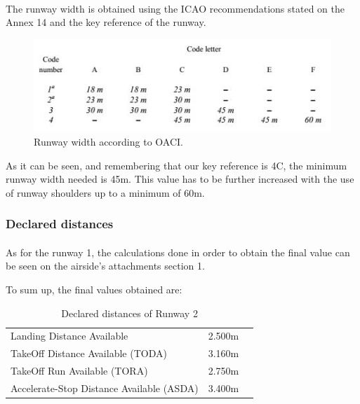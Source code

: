 		\paragraph{}The runway width is obtained using the ICAO recommendations stated on the Annex 14 and the key reference of the runway. 
	
		\begin{figure}[H]
			\centering
			\includegraphics[clip, trim=0cm 0cm 0cm 0cm, width=1\textwidth]{./images/Annex14/RunwayWidth}
			\caption{Runway width according to OACI.} %
			\label{} %
		\end{figure}
	
		As it can be seen, and remembering that our key reference is 4C, the minimum runway width needed is 45m. This value has to be further increased with the use of runway shoulders up to a minimum of 60m. 
	
		\subsubsection{Declared distances}
		\paragraph{} As for the runway 1, the calculations done in order to obtain the final value can be seen on the airside’s attachments section 1. 
	
	To sum up, the final values obtained are:
	
	\begin{table}[htb]
		\centering
		\begin{tabular}{ll p{5cm}}
			\midrule[2pt]
			Landing Distance Available & 2.500m\\
			TakeOff Distance Available (TODA) & 3.160m\\
			TakeOff Run Available (TORA)& 2.750m\\
			Accelerate-Stop Distance Available (ASDA)& 3.400m\\
			\bottomrule[2pt]
		\end{tabular}
		\caption{Declared distances of  Runway 2}
		\label{DeclareddistancesRW2}
	\end{table}
	
